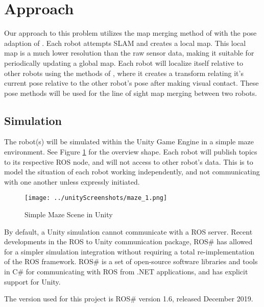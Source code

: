 \documentclass[11pt, conference]{IEEEtran}
\begin{document}
\section{Approach}
Our approach to this problem utilizes the map merging method of \cite{monocular} with the pose adaption of \cite{1067998}. 
Each robot attempts SLAM and creates a local map. This local map is a much lower resolution than the raw sensor data, making it suitable for periodically updating a global map. 
Each robot will localize itself relative to other robots using the methods of \cite{1067998}, where it creates a transform relating it's current pose relative to the other robot's pose after making visual contact. These pose methods will be used for the line of sight map merging between two robots.

\subsection{Simulation}
The robot(s) will be simulated within the Unity Game Engine in a simple maze environment. See Figure \ref{fig:maze} for the overview shape. 
Each robot will publish topics to its respective ROS node, and will not access to other robot's data. This is to model the situation of each robot working independently, and not 
communicating with one another unless expressly initiated. 


\begin{figure}[ht]
\texttt{[image: ../unityScreenshots/maze\_1.png]}
\caption{Simple Maze Scene in Unity}
\label{fig:maze}
\end{figure}


By default, a Unity simulation cannot communicate with a ROS server. 
Recent developments in the ROS to Unity communication package, ROS\# has allowed for a simpler simulation integration without requiring a total re-implementation of the ROS framework. 
ROS\# is a set of open-source software libraries and tools in C\# for communicating with ROS from .NET applications, and has explicit support for Unity. 

The version used for this project is ROS\# version 1.6, released December 2019. \cite{bischoffm}
\end{document}
